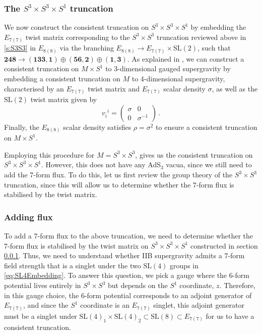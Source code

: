 \documentclass[a4paper, 11pt]{article}
\numberwithin{equation}{section}
\newcommand{\ov}[1]{\overline{#1}}
\newcommand{\SL}[1]{\mathrm{SL}( #1 )}
\newcommand{\EE}{\ensuremath{E_{8(8)}}\xspace}
\newcommand{\En}[1]{E_{#1(#1)}}
\newcommand{\+}{\oplus}
\begin{document}
\subsubsection{The $S^3 \times S^3 \times S^1$ truncation} \label{s:S3S3S1}
We now construct the consistent truncation on $S^3 \times S^3 \times S^1$ by embedding the $\En{7}$ twist matrix corresponding to the $S^3 \times S^3$ truncation reviewed above in \ref{s:S3S3} in $\EE$ via the branching $\EE \rightarrow \En{7} \times \SL{2}$, such that $\mathbf{248} \rightarrow \mathbf{\left(133,1\right)} \oplus \mathbf{\left(56,2\right)} \oplus \mathbf{\left(1,3\right)}$. As explained in \cite{Galli:2022idq}, we can construct a consistent truncation on $M \times S^1$ to 3-dimensional gauged supergravity by embedding a consistent truncation on $M$ to 4-dimensional supergravity, characterised by an $\En{7}$ twist matrix and $\En{7}$ scalar density $\sigma$, as well as 
the $\SL{2}$ twist matrix given by
\begin{equation}
	v_{\ov{i}}{}^i = \begin{pmatrix}
		\sigma & 0 \\ 0 & \sigma^{-1}
	\end{pmatrix} \,.
\end{equation}
Finally, the $\EE$ scalar density satisfies $\rho = \sigma^2$ to ensure a consistent truncation on $M \times S^1$.

Employing this procedure for $M = S^3 \times S^3$, gives us the consistent truncation on $S^3 \times S^3 \times S^1$. However, this does not have any AdS$_3$ vacua, since we still need to add the 7-form flux. To do this, let us first review the group theory of the $S^3 \times S^3$ truncation, since this will allow us to determine whether the 7-form flux is stabilised by the twist matrix.

\subsubsection{Adding flux} \label{s:AddFluxS3S3S1}

To add a 7-form flux to the above truncation, we need to determine whether the 7-form flux is stabilised by the twist matrix on $S^3 \times S^3 \times S^1$ constructed in section \ref{s:S3S3S1}. Thus, we need to understand whether IIB supergravity admits a 7-form field strength that is a singlet under the two $\SL{4}$ groups in \eqref{eq:SL4Embedding}. To answer this question, we pick a gauge where the 6-form potential lives entirely in $S^3 \times S^3$ but depends on the $S^1$ coordinate, $z$. Therefore, in this gauge choice, the 6-form potential corresponds to an adjoint generator of $\En{7}$, and since the $S^1$ coordinate is an $\En{7}$ singlet, this adjoint generator must be a singlet under $\SL{4}_1 \times \SL{4}_2 \subset \SL{8} \subset \En{7}$ for us to have a consistent truncation.
\end{document}
